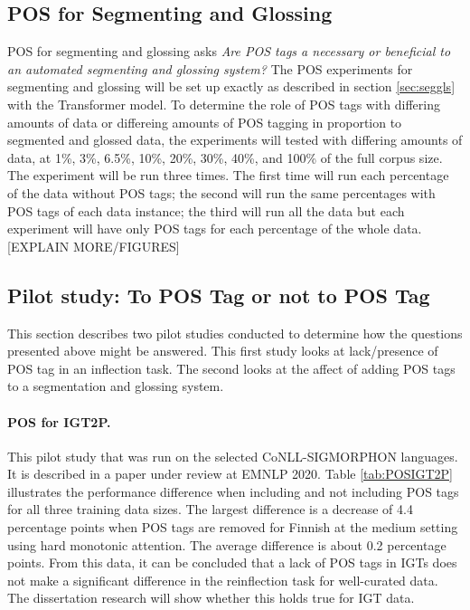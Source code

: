 \subsection{POS for Segmenting and Glossing}

POS for segmenting and glossing asks \textit{Are POS tags a necessary or beneficial to an automated segmenting and glossing system?} The POS experiments for segmenting and glossing will be set up exactly as described in section \ref{sec:seggls} with the Transformer model. To determine the role of POS tags with differing amounts of data or differeing amounts of POS tagging in proportion to segmented and glossed data, the experiments will tested with differing amounts of data, at 1\%, 3\%, 6.5\%, 10\%, 20\%, 30\%, 40\%, and 100\% of the full corpus size. The experiment will be run three times. The first time will run each percentage of the data without POS tags; the second will run the same percentages with POS tags of each data instance; the third will run all the data but each experiment will have only POS tags for each percentage of the whole data. [EXPLAIN MORE/FIGURES]

\subsection{Pilot study: To POS Tag or not to POS Tag}

This section describes two pilot studies conducted to determine how the questions presented above might be answered. This first study looks at lack/presence of POS tag in an inflection task. The second looks at the affect of adding POS tags to a segmentation and glossing system.

\paragraph{POS for IGT2P.}
This pilot study that was run on the selected CoNLL-SIGMORPHON languages. It is described in a paper under review at EMNLP 2020. 
Table \ref{tab:POSIGT2P} illustrates the performance difference when including and not including POS tags for all three training data sizes. 
The largest difference is a decrease of 4.4 percentage points when POS tags are removed for Finnish at the medium setting using hard monotonic attention. 
The average difference is about 0.2 percentage points.
From this data, it can be concluded that a lack of POS tags in IGTs does not make a significant difference in the reinflection task for well-curated data. The dissertation research will show whether this holds true for IGT data.

